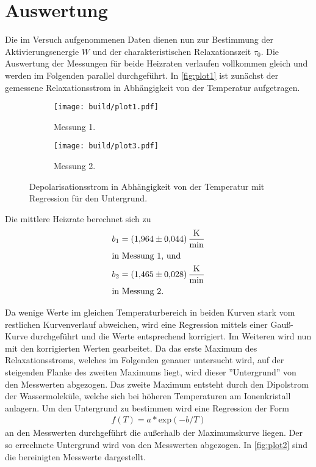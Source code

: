 \section{Auswertung}
\label{sec:Auswertung}

Die im Versuch aufgenommenen Daten dienen nun zur Bestimmung der Aktivierungsenergie $W$ und der charakteristischen Relaxationszeit $\tau_0$.
Die Auswertung der Messungen für beide Heizraten verlaufen vollkommen gleich und werden im Folgenden parallel durchgeführt.
In \autoref{fig:plot1} ist zunächst der gemessene Relaxationsstrom in Abhängigkeit von der Temperatur aufgetragen.

\begin{figure}[H]
  \begin{subfigure}{\textwidth}
  \centering
  \texttt{[image: build/plot1.pdf]}
  \caption{Messung 1.}
  \label{fig:plot1a}
  \end{subfigure}
  \hfill
  \begin{subfigure}{\textwidth}
  \centering
  \texttt{[image: build/plot3.pdf]}
  \caption{Messung 2.}
  \label{fig:plot1b}
  \end{subfigure}
  \caption{Depolarisationsstrom in Abhängigkeit von der Temperatur mit Regression für den Untergrund.}
  \label{fig:plot1}
\end{figure}

Die mittlere Heizrate berechnet sich zu
\begin{align*}
  b_1&= \qty{1.964 \pm 0.044}{\kelvin\per\minute}\\
\intertext{in Messung 1, und}
  b_2 &= \qty{1.465 \pm 0.028}{\kelvin\per\minute}\\
\intertext{in Messung 2.}
\end{align*}

Da wenige Werte im gleichen Temperaturbereich in beiden Kurven stark vom restlichen Kurvenverlauf abweichen, wird eine Regression mittels
einer Gauß-Kurve durchgeführt und die Werte entsprechend korrigiert. Im Weiteren wird nun mit den korrigierten Werten gearbeitet.
Da das erste Maximum des Relaxationsstroms, welches im Folgenden genauer
untersucht wird, auf der steigenden Flanke des zweiten Maximums liegt, wird dieser
”Untergrund” von den Messwerten abgezogen.
Das zweite Maximum entsteht durch den Dipolstrom der Wassermoleküle, welche sich bei höheren Temperaturen am Ionenkristall anlagern.
Um den Untergrund zu bestimmen wird eine Regression der Form
\begin{align*}
  f(T)= a * \text{exp}(-b/T)
\end{align*}
an den Messwerten durchgeführt die außerhalb der Maximumskurve liegen.
Der so errechnete Untergrund wird von den Messwerten abgezogen.
In \autoref{fig:plot2} sind die bereinigten Messwerte dargestellt.

